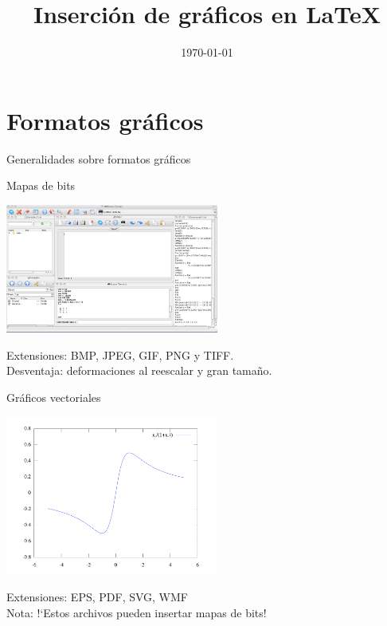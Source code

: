 \documentclass{beamer}
\title[Taller de \LaTeX]{Inserci\'on de gr\'aficos en \LaTeX}
\author[O. S\'anchez]{}
\institute[UGR]{Universidad de Granada}
\date{\today}
\begin{document}
\maketitle

\section{Formatos gr\'aficos}
\begin{frame}{Generalidades sobre formatos gr\'aficos}
\begin{block}{Mapas de bits} 
\begin{center}
\includegraphics[width=7cm]{./graficos/QtOctave.pdf}
\end{center}
Extensiones: BMP, JPEG, GIF, PNG y TIFF. \\
{\small Desventaja: deformaciones al reescalar y gran tama\~no.}
\end{block}
\end{frame}
\begin{frame}
\begin{block} {Gr\'aficos vectoriales} 
\begin{center}
\includegraphics[width=7cm]{graficos/fplot.pdf}
\end{center}
Extensiones: EPS, PDF, SVG, WMF \\
{\small Nota: !`Estos archivos pueden insertar mapas de bits! }
\end{block}
\end{frame}

\end{document}
